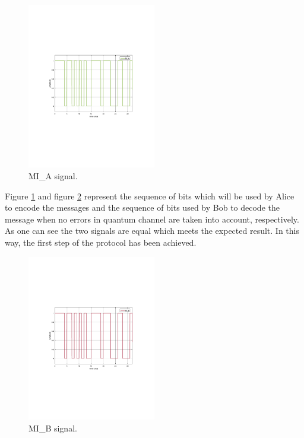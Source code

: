 \begin{refsection}
\begin{figure}[H]
    \centering
        \includegraphics[clip, trim=3cm 9.0cm 2cm 7cm, width=0.50\textwidth]{./sdf/bb84_with_discrete_variables/figures/mia.pdf}
    \caption{MI\_A signal. }\label{mia}
\end{figure}

Figure \ref{mia} and figure \ref{mib} represent the sequence of bits which will be used by Alice to encode the messages and the sequence of bits used by Bob to decode the message when no errors in quantum channel are taken into account, respectively. As one can see the two signals are equal which meets the expected result. In this way, the first step of the protocol has been achieved.

\begin{figure}[h]
    \centering
        \includegraphics[clip, trim=3cm 9.5cm 2cm 7cm, width=0.50\textwidth]{./sdf/bb84_with_discrete_variables/figures/mib.pdf}
    \caption{MI\_B signal. }\label{mib}
\end{figure}


\end{refsection}
